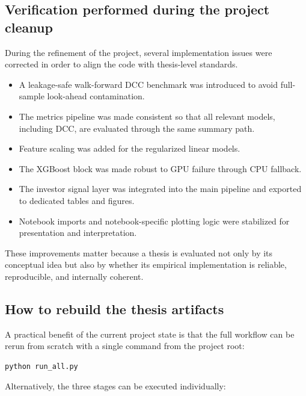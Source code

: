 \subsection{Verification performed during the project cleanup}

During the refinement of the project, several implementation issues were corrected in order to align the code with thesis-level standards.

\begin{itemize}
    \item A leakage-safe walk-forward DCC benchmark was introduced to avoid full-sample look-ahead contamination.
    \item The metrics pipeline was made consistent so that all relevant models, including DCC, are evaluated through the same summary path.
    \item Feature scaling was added for the regularized linear models.
    \item The XGBoost block was made robust to GPU failure through CPU fallback.
    \item The investor signal layer was integrated into the main pipeline and exported to dedicated tables and figures.
    \item Notebook imports and notebook-specific plotting logic were stabilized for presentation and interpretation.
\end{itemize}

These improvements matter because a thesis is evaluated not only by its conceptual idea but also by whether its empirical implementation is reliable, reproducible, and internally coherent.

\subsection{How to rebuild the thesis artifacts}

A practical benefit of the current project state is that the full workflow can be rerun from scratch with a single command from the project root:

\begin{lstlisting}[language={}, caption={Full rebuild from the project root directory.}, label=lst:rebuild]
python run_all.py
\end{lstlisting}

Alternatively, the three stages can be executed individually:

